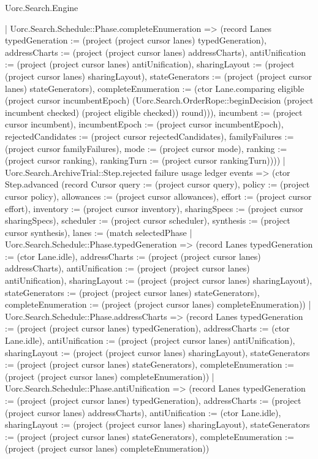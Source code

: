 \begin{lexlean}{Uorc.Search.Engine}
\begin{semanticmodule}
{{          | Uorc.Search.Schedule::Phase.completeEnumeration => (record Lanes {typedGeneration := (project (project cursor lanes) typedGeneration), addressCharts := (project (project cursor lanes) addressCharts), antiUnification := (project (project cursor lanes) antiUnification), sharingLayout := (project (project cursor lanes) sharingLayout), stateGenerators := (project (project cursor lanes) stateGenerators), completeEnumeration := (ctor Lane.comparing eligible (project cursor incumbentEpoch) (Uorc.Search.OrderRope::beginDecision (project incumbent checked) (project eligible checked)) round)})), incumbent := (project cursor incumbent), incumbentEpoch := (project cursor incumbentEpoch), rejectedCandidates := (project cursor rejectedCandidates), familyFailures := (project cursor familyFailures), mode := (project cursor mode), ranking := (project cursor ranking), rankingTurn := (project cursor rankingTurn)})))
      | Uorc.Search.ArchiveTrial::Step.rejected failure usage ledger events => (ctor Step.advanced (record Cursor {query := (project cursor query), policy := (project cursor policy), allowances := (project cursor allowances), effort := (project cursor effort), inventory := (project cursor inventory), sharingSpecs := (project cursor sharingSpecs), scheduler := (project cursor scheduler), synthesis := (project cursor synthesis), lanes := (match selectedPhase
        | Uorc.Search.Schedule::Phase.typedGeneration => (record Lanes {typedGeneration := (ctor Lane.idle), addressCharts := (project (project cursor lanes) addressCharts), antiUnification := (project (project cursor lanes) antiUnification), sharingLayout := (project (project cursor lanes) sharingLayout), stateGenerators := (project (project cursor lanes) stateGenerators), completeEnumeration := (project (project cursor lanes) completeEnumeration)})
        | Uorc.Search.Schedule::Phase.addressCharts => (record Lanes {typedGeneration := (project (project cursor lanes) typedGeneration), addressCharts := (ctor Lane.idle), antiUnification := (project (project cursor lanes) antiUnification), sharingLayout := (project (project cursor lanes) sharingLayout), stateGenerators := (project (project cursor lanes) stateGenerators), completeEnumeration := (project (project cursor lanes) completeEnumeration)})
        | Uorc.Search.Schedule::Phase.antiUnification => (record Lanes {typedGeneration := (project (project cursor lanes) typedGeneration), addressCharts := (project (project cursor lanes) addressCharts), antiUnification := (ctor Lane.idle), sharingLayout := (project (project cursor lanes) sharingLayout), stateGenerators := (project (project cursor lanes) stateGenerators), completeEnumeration := (project (project cursor lanes) completeEnumeration)})
}}
\end{semanticmodule}
\end{lexlean}
